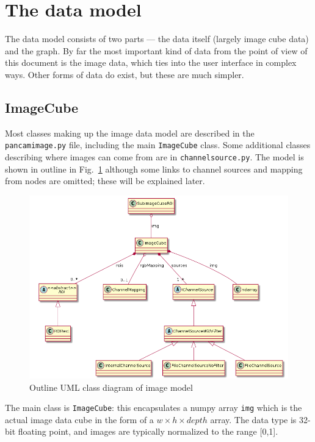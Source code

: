 

\section{The data model}
The data model consists of two parts --- the data itself (largely
image cube data) and the graph. By far the most important kind of data
from the point of view of this document is the image data, which ties
into the user interface in complex ways. Other forms of data do exist,
but these are much simpler.

\subsection{ImageCube}
Most classes making up the image data 
model are described in the \texttt{pancamimage.py} file, including the main \texttt{ImageCube}
class. Some additional classes describing where images can come from are in \texttt{channelsource.py}.
The model is shown in outline in Fig.~\ref{image.png} although some links to channel sources
and mapping from nodes are omitted; these will be explained later.

\begin{figure}[ht]
\center
\includegraphics[width=5in]{image.png}
\caption{Outline UML class diagram of image model}
\label{image.png}
\end{figure}

The main class is \texttt{ImageCube}: this encapsulates a numpy array
\texttt{img}
which is the actual image data cube in the form
of a $w \times h \times depth$ array. The data type is 32-bit floating
point, and images are typically normalized to the range [0,1].

